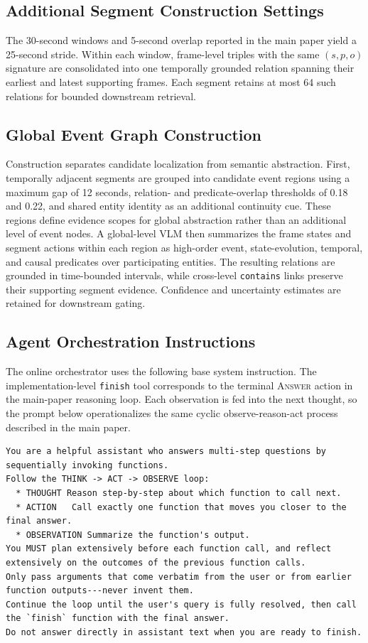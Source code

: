 \documentclass[letterpaper]{article}
\begin{document}
\subsection{Additional Segment Construction Settings}

The 30-second windows and 5-second overlap reported in the main paper yield a 25-second stride.
Within each window, frame-level triples with the same $(s,p,o)$ signature are consolidated into one temporally grounded relation spanning their earliest and latest supporting frames.
Each segment retains at most 64 such relations for bounded downstream retrieval.

\subsection{Global Event Graph Construction}

Construction separates candidate localization from semantic abstraction.
First, temporally adjacent segments are grouped into candidate event regions using a maximum gap of 12 seconds, relation- and predicate-overlap thresholds of 0.18 and 0.22, and shared entity identity as an additional continuity cue.
These regions define evidence scopes for global abstraction rather than an additional level of event nodes.
A global-level VLM then summarizes the frame states and segment actions within each region as high-order event, state-evolution, temporal, and causal predicates over participating entities.
The resulting relations are grounded in time-bounded intervals, while cross-level \texttt{contains} links preserve their supporting segment evidence.
Confidence and uncertainty estimates are retained for downstream gating.

\subsection{Agent Orchestration Instructions}

The online orchestrator uses the following base system instruction.
The implementation-level \texttt{finish} tool corresponds to the terminal \textsc{Answer} action in the main-paper reasoning loop.
Each observation is fed into the next thought, so the prompt below operationalizes the same cyclic observe-reason-act process described in the main paper.

\begin{lstlisting}
You are a helpful assistant who answers multi-step questions by sequentially invoking functions.
Follow the THINK -> ACT -> OBSERVE loop:
  * THOUGHT Reason step-by-step about which function to call next.
  * ACTION   Call exactly one function that moves you closer to the final answer.
  * OBSERVATION Summarize the function's output.
You MUST plan extensively before each function call, and reflect extensively on the outcomes of the previous function calls.
Only pass arguments that come verbatim from the user or from earlier function outputs---never invent them.
Continue the loop until the user's query is fully resolved, then call the `finish` function with the final answer.
Do not answer directly in assistant text when you are ready to finish.
\end{lstlisting}
\end{document}
